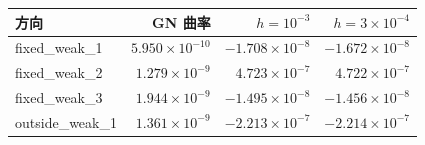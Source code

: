 \begin{tabular}{lrrr}
\toprule
方向 & GN 曲率 & $h=10^{-3}$ & $h=3\times10^{-4}$ \\
\midrule
fixed\_weak\_1 & $5.950\times10^{-10}$ & $-1.708\times10^{-8}$ & $-1.672\times10^{-8}$ \\
fixed\_weak\_2 & $1.279\times10^{-9}$ & $4.723\times10^{-7}$ & $4.722\times10^{-7}$ \\
fixed\_weak\_3 & $1.944\times10^{-9}$ & $-1.495\times10^{-8}$ & $-1.456\times10^{-8}$ \\
outside\_weak\_1 & $1.361\times10^{-9}$ & $-2.213\times10^{-7}$ & $-2.214\times10^{-7}$ \\
\bottomrule
\end{tabular}
